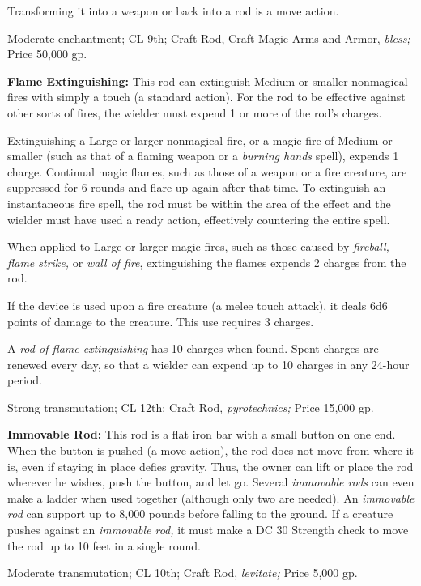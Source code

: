 Transforming it into a weapon or back into a rod is a move action.

Moderate enchantment; CL 9th; Craft Rod, Craft Magic Arms and Armor, \textit{bless; 
}Price 50,000 gp.

\textbf{Flame Extinguishing: }This rod can extinguish Medium or smaller nonmagical 
fires with simply a touch (a standard action). For the rod to be effective against 
other sorts of fires, the wielder must expend 1 or more of the rod's charges.

Extinguishing a Large or larger nonmagical fire, or a magic fire of Medium or smaller 
(such as that of a flaming weapon or a \textit{burning hands }spell), expends 1 
charge. Continual magic flames, such as those of a weapon or a fire creature, are 
suppressed for 6 rounds and flare up again after that time. To extinguish an instantaneous 
fire spell, the rod must be within the area of the effect and the wielder must 
have used a ready action, effectively countering the entire spell.

When applied to Large or larger magic fires, such as those caused by \textit{fireball, 
flame strike, }or \textit{wall of fire}, extinguishing the flames expends 2 charges 
from the rod.

If the device is used upon a fire creature (a melee touch attack), it deals 6d6 
points of damage to the creature. This use requires 3 charges.

A \textit{rod of flame extinguishing }has 10 charges when found. Spent charges 
are renewed every day, so that a wielder can expend up to 10 charges in any 24-hour 
period.

Strong transmutation; CL 12th; Craft Rod, \textit{pyrotechnics; }Price 15,000 gp.

\textbf{Immovable Rod:} This rod is a flat iron bar with a small button on one 
end. When the button is pushed (a move action), the rod does not move from where 
it is, even if staying in place defies gravity. Thus, the owner can lift or place 
the rod wherever he wishes, push the button, and let go. Several \textit{immovable 
rods }can even make a ladder when used together (although only two are needed). 
An \textit{immovable rod }can support up to 8,000 pounds before falling to the 
ground. If a creature pushes against an \textit{immovable rod, }it must make a 
DC 30 Strength check to move the rod up to 10 feet in a single round.

Moderate transmutation; CL 10th; Craft Rod, \textit{levitate; }Price 5,000 gp.

